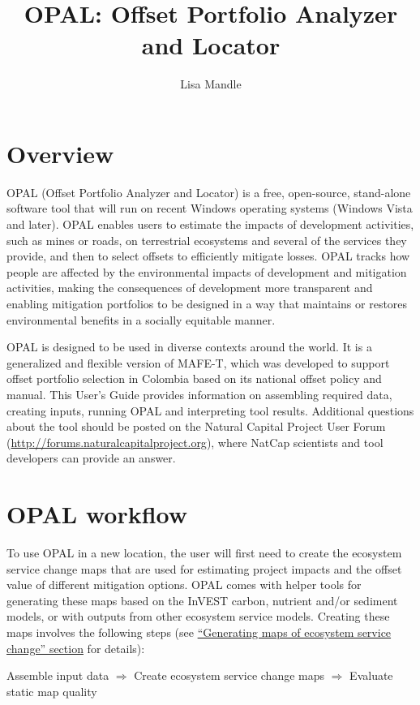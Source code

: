 \documentclass[11pt,letterpaper]{report}
\title{OPAL: Offset Portfolio Analyzer and Locator}
\author{Lisa Mandle}
\begin{document}


\newpage
	\tableofcontents

\newpage
\chapter{Overview}

	OPAL (Offset Portfolio Analyzer and Locator) is a free, open-source, stand-alone software tool that will run on recent Windows operating systems (Windows Vista and later). OPAL enables users to estimate the impacts of development activities, such as mines or roads, on terrestrial ecosystems and several of the services they provide, and then to select offsets to efficiently mitigate losses. OPAL tracks how people are affected by the environmental impacts of development and mitigation activities, making the consequences of development more transparent and enabling mitigation portfolios to be designed in a way that maintains or restores environmental benefits in a socially equitable manner.
	
	OPAL is designed to be used in diverse contexts around the world. It is a generalized and flexible version of MAFE-T, which was developed to support offset portfolio selection in Colombia based on its national offset policy and manual. This User's Guide provides information on assembling required data, creating inputs, running OPAL and interpreting tool results. Additional questions about the tool should be posted on the Natural Capital Project User Forum (\url{http://forums.naturalcapitalproject.org}), where NatCap scientists and tool developers can provide an answer.

\chapter{OPAL workflow}

	To use OPAL in a new location, the user will first need to create the ecosystem service change maps that are used for estimating project impacts and the offset value of different mitigation options. OPAL comes with helper tools for generating these maps based on the InVEST carbon, nutrient and/or sediment models, or with outputs from other ecosystem service models.  Creating these maps involves the following steps (see \hyperref[ch:maps]{``Generating maps of ecosystem service change'' section} for details):
	
	\begin{center}
		{\sffamily Assemble input data $\Rightarrow$ Create ecosystem service change maps $\Rightarrow$ Evaluate static map quality}
	\end{center}
	
\end{document}
